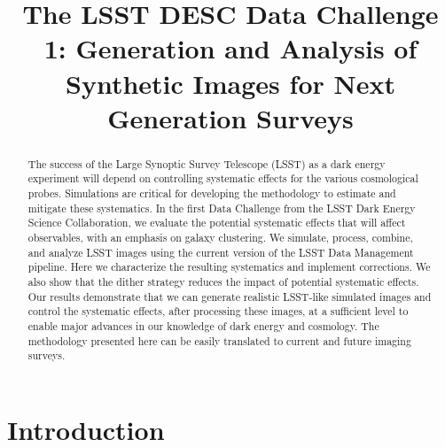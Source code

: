 \documentclass[\docopts]{\docclass}
\begin{document}
\title[LSST DESC DC1]{The LSST DESC Data Challenge 1: Generation and Analysis of Synthetic Images for Next Generation Surveys }

\maketitlepre

\begin{abstract}

The success of the Large Synoptic Survey Telescope (LSST) as a dark energy experiment will depend on controlling systematic effects for the various cosmological probes.  Simulations are critical for developing the methodology to estimate and mitigate these systematics.  In the first Data Challenge from the LSST Dark Energy Science Collaboration, we evaluate the potential systematic effects that will affect observables, with an emphasis on galaxy clustering.  We simulate, process, combine, and analyze LSST images using the current version of the LSST Data Management pipeline.  Here we characterize the resulting systematics and implement corrections. We also show that the dither strategy reduces the impact of potential systematic effects. Our results demonstrate that we can generate realistic LSST-like simulated images and control the systematic effects, after processing these images, at a sufficient level to enable major advances in our knowledge of dark energy and cosmology. The methodology presented here can be easily translated to current and future imaging surveys.
\end{abstract}


\maketitlepost

%

\section{Introduction}
\label{sec:intro}
\end{document}

